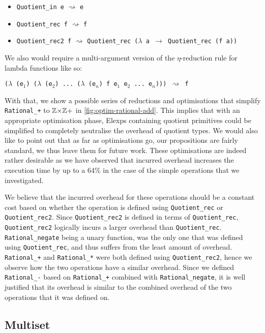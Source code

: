 \documentclass[12pt,twoside,maitrise]{dms}
\theoremstyle{definition}
\numberwithin{equation}{section}
\numberwithin{table}{chapter}
\numberwithin{figure}{chapter}
\newcommand\id[1] {\texttt{#1}}
\newcommand\fn[1] {\texttt{#1}}
\begin{document}
\begin{itemize}
  \item{\fn{Quotient\_in e} $\rightsquigarrow$ \id{e}}

  \item{\fn{Quotient\_rec f} $\rightsquigarrow$ \id{f}}

  \item{\fn{Quotient\_rec2 f} $\rightsquigarrow$ \fn{Quotient\_rec ($\lambda$ a $\rightarrow$ Quotient\_rec (f a))}}
\end{itemize}

We also would require a multi-argument version of the $\eta$-reduction rule for
lambda functions like so:

\fn{($\lambda$ (e$_1$) ($\lambda$ (e$_2$) ... ($\lambda$ (e$_n$) f e$_1$ e$_2$ ... e$_n$))) $\rightsquigarrow$ f}

With that, we show a possible series of reductions and optimisations that
simplify \fn{Rational\_+} to $\mathbb{Z}{\times}\mathbb{Z}+$ in \autoref{fig:optim-rational-add}.
This implies that with an appropriate optimisation phase, Elexps containing
quotient primitives could be simplified to completely neutralise the overhead of
quotient types. We would also like to point out that as far as optimisations go,
our propositions are fairly standard, we thus leave them for future work. These
optimisations are indeed rather desirable as we have observed that incurred
overhead increases the execution time by up to a 64\% in the case of the simple
operations that we investigated.

We believe that the incurred overhead for these operations should be a constant
cost based on whether the operation is defined using \id{Quotient\_rec} or
\id{Quotient\_rec2}. Since \id{Quotient\_rec2} is defined in terms of
\id{Quotient\_rec}, \id{Quotient\_rec2} logically incurs a larger overhead than
\id{Quotient\_rec}. \id{Rational\_negate} being a unary function, was the only
one that was defined using \id{Quotient\_rec}, and thus suffers from the least
amount of overhead. \id{Rational\_+} and \id{Rational\_*} were both defined
using \id{Quotient\_rec2}, hence we observe how the two operations have a
similar overhead. Since we defined \id{Rational\_-} based on \id{Rational\_+}
combined with \id{Rational\_negate}, it is well justified that its overhead is
similar to the combined overhead of the two operations that it was defined on.

\subsection*{Multiset}
\end{document}
